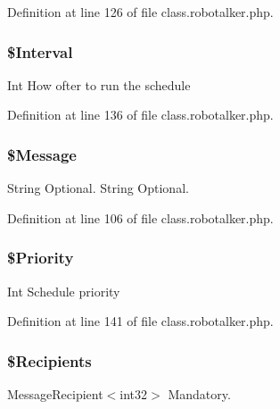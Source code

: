 Definition at line 126 of file class.\-robotalker.\-php.

\hypertarget{class_schedule_calls_request_of_int32_a06a0c2a526e2a41abe73b0ffdf2932ee}{
\subsubsection[{\$\-Interval}]{\setlength{\rightskip}{0pt plus 5cm}\$Interval}}\label{class_schedule_calls_request_of_int32_a06a0c2a526e2a41abe73b0ffdf2932ee}
Int How ofter to run the schedule 

Definition at line 136 of file class.\-robotalker.\-php.

\hypertarget{class_schedule_calls_request_of_int32_ab23576849f64a6b190167099cfab7eae}{
\subsubsection[{\$\-Message}]{\setlength{\rightskip}{0pt plus 5cm}\$Message}}\label{class_schedule_calls_request_of_int32_ab23576849f64a6b190167099cfab7eae}
String Optional. String Optional. 

Definition at line 106 of file class.\-robotalker.\-php.

\hypertarget{class_schedule_calls_request_of_int32_a7c6546640ba3eafd143d8f0e6805de27}{
\subsubsection[{\$\-Priority}]{\setlength{\rightskip}{0pt plus 5cm}\$Priority}}\label{class_schedule_calls_request_of_int32_a7c6546640ba3eafd143d8f0e6805de27}
Int Schedule priority 

Definition at line 141 of file class.\-robotalker.\-php.

\hypertarget{class_schedule_calls_request_of_int32_a33ad804cbe51afe501872f4363f0c068}{
\subsubsection[{\$\-Recipients}]{\setlength{\rightskip}{0pt plus 5cm}\$Recipients}}\label{class_schedule_calls_request_of_int32_a33ad804cbe51afe501872f4363f0c068}
Message\-Recipient$<$int32$>$ Mandatory. 

